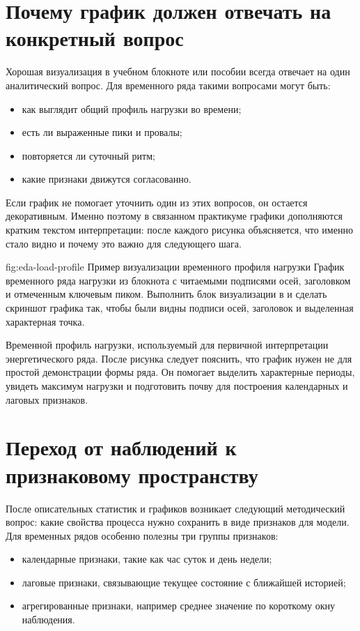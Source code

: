 \section{Почему график должен отвечать на конкретный вопрос}

Хорошая визуализация в учебном блокноте или пособии всегда отвечает на один аналитический вопрос. Для временного ряда такими вопросами могут быть:
\begin{itemize}[leftmargin=1.25cm]
\item как выглядит общий профиль нагрузки во времени;
\item есть ли выраженные пики и провалы;
\item повторяется ли суточный ритм;
\item какие признаки движутся согласованно.
\end{itemize}

Если график не помогает уточнить один из этих вопросов, он остается декоративным. Именно поэтому в связанном практикуме графики дополняются кратким текстом интерпретации: после каждого рисунка объясняется, что именно стало видно и почему это важно для следующего шага.

\screenshotplaceholder
  {fig:eda-load-profile}
  {Пример визуализации временного профиля нагрузки}
  {График временного ряда нагрузки из блокнота  с читаемыми подписями осей, заголовком и отмеченным ключевым пиком.}
  {Выполнить блок визуализации в  и сделать скриншот графика так, чтобы были видны подписи осей, заголовок и выделенная характерная точка.}

\figureinstruction
  {Временной профиль нагрузки, используемый для первичной интерпретации энергетического ряда.}
  {После рисунка следует пояснить, что график нужен не для простой демонстрации формы ряда. Он помогает выделить характерные периоды, увидеть максимум нагрузки и подготовить почву для построения календарных и лаговых признаков.}

\section{Переход от наблюдений к признаковому пространству}

После описательных статистик и графиков возникает следующий методический вопрос: какие свойства процесса нужно сохранить в виде признаков для модели. Для временных рядов особенно полезны три группы признаков:
\begin{itemize}[leftmargin=1.25cm]
\item календарные признаки, такие как час суток и день недели;
\item лаговые признаки, связывающие текущее состояние с ближайшей историей;
\item агрегированные признаки, например среднее значение по короткому окну наблюдения.
\end{itemize}

